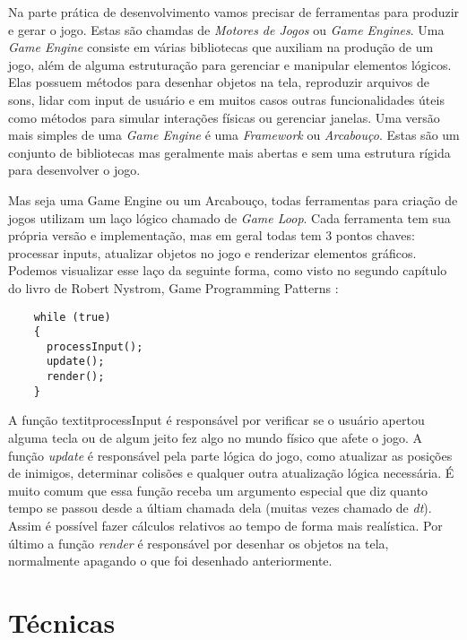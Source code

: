   Na parte prática de desenvolvimento vamos precisar de ferramentas para produzir e gerar o jogo. Estas são chamdas de \textit{Motores de Jogos} ou \textit{Game Engines}. Uma \textit{Game Engine} consiste em várias bibliotecas que auxiliam na produção de um jogo, além de alguma estruturação para gerenciar e manipular elementos lógicos. Elas possuem métodos para desenhar objetos na tela, reproduzir arquivos de sons, lidar com input de usuário e em muitos casos outras funcionalidades úteis como métodos para simular interações físicas ou gerenciar janelas. Uma versão mais simples de uma \textit{Game Engine} é uma \textit{Framework} ou \textit{Arcabouço}. Estas são um conjunto de bibliotecas mas geralmente mais abertas  e sem uma estrutura rígida para desenvolver o jogo.

  Mas seja uma Game Engine ou um Arcabouço, todas ferramentas para criação de jogos utilizam um laço lógico chamado de \textit{Game Loop}. Cada ferramenta tem sua própria versão e implementação, mas em geral todas tem 3 pontos chaves: processar inputs, atualizar objetos no jogo e renderizar elementos gráficos. Podemos visualizar esse laço da seguinte forma, como visto no segundo capítulo do livro de Robert Nystrom, Game Programming Patterns \cite{robertgameloop}:

  \begin{lstlisting}
    while (true)
    {
      processInput();
      update();
      render();
    }
  \end{lstlisting}

  A função textit{processInput} é responsável por verificar se o usuário apertou alguma tecla ou de algum jeito fez algo no mundo físico que afete o jogo. A função \textit{update} é responsável pela parte lógica do jogo, como atualizar as posições de inimigos, determinar colisões e qualquer outra atualização lógica necessária. É muito comum que essa função receba um argumento especial que diz quanto tempo se passou desde a últiam chamada dela (muitas vezes chamado de \textit{dt}). Assim é possível fazer cálculos relativos ao tempo de forma mais realística. Por último a função \textit{render} é responsável por desenhar os objetos na tela, normalmente apagando o que foi desenhado anteriormente.


\section{Técnicas}
\label{sec:tecnicas}

